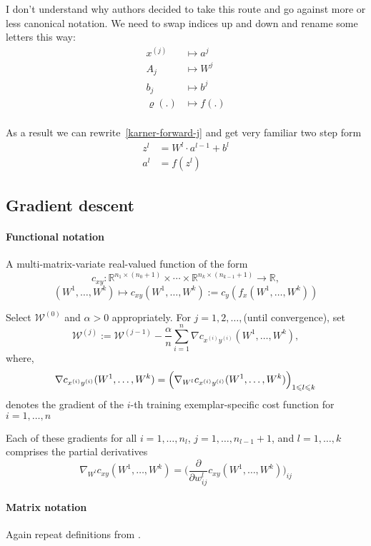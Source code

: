 \documentclass[draft]{article}
\def\RealSet{\mathbb{R}}
\begin{document}
I don't understand why authors decided to take this route and go against more or less canonical notation. We need to swap indices up and down and rename some letters this way:
\begin{align}
x^{(j)} &\mapsto a^j \\
A_j &\mapsto W^j \\
b_j &\mapsto b^j \\
\varrho(.) &\mapsto f(.) \\
\end{align}

As a result we can rewrite~\eqref{karner-forward-j} and get very familiar two step form
\begin{align}
z^l &= W^l \cdot a^{l-1} + b^l \\
a^l &= f(z^l)
\end{align}


\subsection{Gradient descent}

\paragraph{Functional notation}
A multi-matrix-variate real-valued function of the form
\[
c_{xy} \colon \RealSet^{n_1 \times (n_0 + 1)} \times \cdots \times \RealSet^{n_k \times (n_{k-1} + 1)} \rightarrow \RealSet,
\]
\[
(W^1,\dots,W^k) \mapsto c_{xy}(W^1,\dots,W^k) := c_y(f_x(W^1,\dots,W^k))
\]

Select $\mathcal{W}^{(0)}$ and $\alpha > 0$ appropriately. For $j = 1,2,\dots,$(until convergence), set
\[
\mathcal{W}^{(j)} := \mathcal{W}^{(j-1)} - \frac{\alpha}{n} \sum_{i=1}^n \nabla c_{x^{(i)}y^{(i)}}(W^1,\dots,W^k),
\]
where,
\[
\nabla c_{x^{(i)}y^{(i)}}(W^1,\dots,W^k) = \Bigl(\nabla_{W^l} c_{x^{(i)}y^{(i)}}(W^1,\dots,W^k) \Bigr)_{1\leqslant l \leqslant k}
\]
denotes the gradient of the $i$-th training exemplar-specific cost function for $i = 1,\dots,n$

Each of these gradients for all $i = 1,\dots,n_l$, $j = 1,\dots,n_{l-1} + 1$, and $l = 1,\dots,k$ comprises the partial derivatives
\[
\nabla_{W^l} c_{xy}(W^1,\dots,W^k) = \Biggl( \frac{\partial}{\partial w_{ij}^l} c_{xy}(W^1,\dots,W^k) \Biggr)_{ij}
\]


\paragraph{Matrix notation}
Again repeat definitions from \cite{Karner:2022}.
\end{document}
